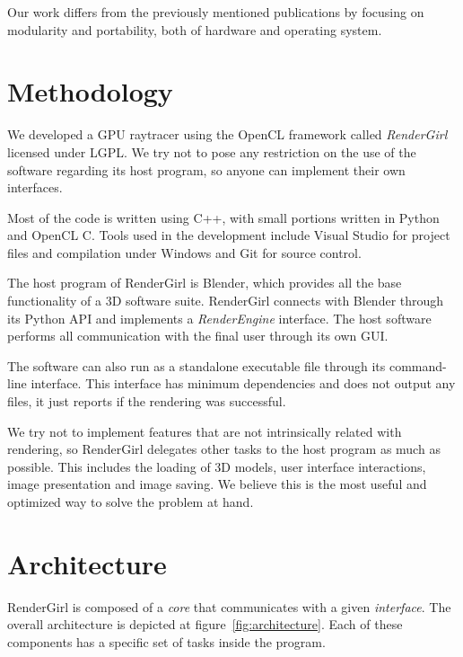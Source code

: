 \documentclass{vgtc}
\begin{document}
Our work differs from the previously mentioned publications by
focusing on modularity and portability, both of hardware and operating
system.

\section{Methodology}
\label{sec:methodology}

We developed a GPU raytracer using the OpenCL framework called
\emph{RenderGirl} %
licensed under LGPL.
We try not to pose any restriction on the use of the software
regarding its host program, so anyone can implement their own
interfaces.

Most of the code is written using C++, with small portions
written in Python and OpenCL C. Tools used in the development include
Visual Studio for project files and compilation under Windows and Git
for source control.

The host program of RenderGirl is Blender, which provides all the base
functionality of a 3D software suite. RenderGirl connects with Blender
through its Python API and implements a \emph{RenderEngine}
interface. The host software performs all communication with the final
user through its own GUI.

The software can also run as a standalone executable file through its
command-line interface. This interface has minimum dependencies and
does not output any files, it just reports if the rendering was successful.

We try not to implement features that are not intrinsically related with
rendering, so RenderGirl delegates other tasks to the host program as
much as possible. This includes the loading of 3D models, user interface
interactions, image presentation and image saving. We believe this is the
most useful and optimized way to solve the problem at hand.

\section{Architecture}
\label{sec:architecture}

RenderGirl is composed of a \emph{core} that communicates with a given
\emph{interface}. The overall architecture is depicted at figure~\ref{fig:architecture}. Each of these components has a specific set
of tasks inside the program.
\end{document}
